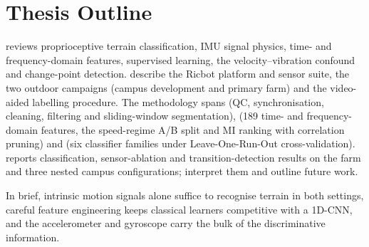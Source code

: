 \section{Thesis Outline}

 reviews proprioceptive terrain classification, IMU signal physics, time- and frequency-domain features, supervised learning, the velocity--vibration confound and change-point detection.  describe the Ricbot platform and sensor suite, the two outdoor campaigns (campus development and primary farm) and the video-aided labelling procedure. The methodology spans  (QC, synchronisation, cleaning, filtering and sliding-window segmentation),  (189 time- and frequency-domain features, the speed-regime A/B split and MI ranking with correlation pruning) and  (six classifier families under Leave-One-Run-Out cross-validation).  reports classification, sensor-ablation and transition-detection results on the farm and three nested campus configurations;  interpret them and outline future work.

In brief, intrinsic motion signals alone suffice to recognise terrain in both settings, careful feature engineering keeps classical learners competitive with a 1D-CNN, and the accelerometer and gyroscope carry the bulk of the discriminative information.